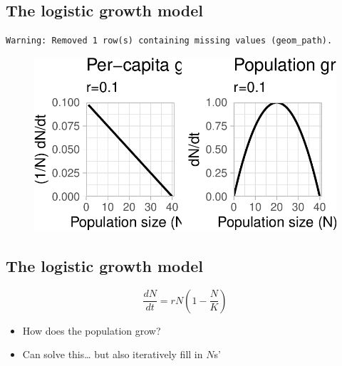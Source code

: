 \documentclass[
  letterpaper,
  DIV=11,
  numbers=noendperiod]{scrartcl}
\begin{document}
\hypertarget{the-logistic-growth-model-5}{%
\subsection{The logistic growth
model}\label{the-logistic-growth-model-5}}

\begin{verbatim}
Warning: Removed 1 row(s) containing missing values (geom_path).
\end{verbatim}

\begin{figure}

{\centering \includegraphics{ecological_interactions_files/figure-pdf/unnamed-chunk-6-1.pdf}

}

\end{figure}

\hypertarget{the-logistic-growth-model-6}{%
\subsection{The logistic growth
model}\label{the-logistic-growth-model-6}}

\[\frac{dN}{dt}=rN(1-\frac{N}{K})\]

\begin{itemize}
\item
  How does the population grow?
\item
  Can solve this\ldots{} but also iteratively fill in \(N\)s'
\end{itemize}
\end{document}
